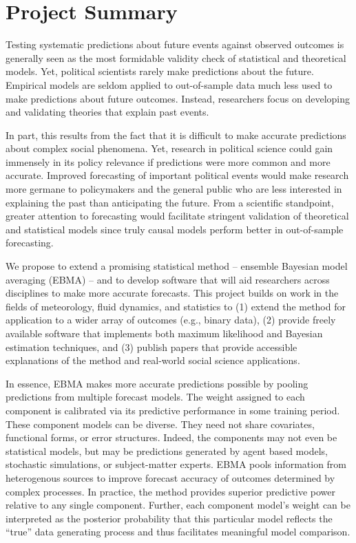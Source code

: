 \documentclass[pdftex,12pt,fullpage,oneside]{amsart}
\begin{document}
\section*{Project Summary}

\thispagestyle{empty}


Testing systematic predictions about future events against observed
outcomes is generally seen as the most formidable validity check of
statistical and theoretical models.  Yet, political scientists rarely
make predictions about the future.  Empirical models are seldom
applied to out-of-sample data much less used to make predictions about
future outcomes. Instead, researchers focus on developing and
validating theories that explain past events.

In part, this results from the fact that it is difficult to make
accurate predictions about complex social phenomena. Yet, research in
political science could gain immensely in its policy relevance if
predictions were more common and more accurate.  Improved forecasting
of important political events would make research more germane to
policymakers and the general public who are less interested in
explaining the past than anticipating the future.  From a scientific
standpoint, greater attention to forecasting would facilitate
stringent validation of theoretical and statistical models since truly
causal models perform better in out-of-sample forecasting.

We propose to extend a promising statistical method -- ensemble
Bayesian model averaging (EBMA) -- and to develop software that will
aid researchers across disciplines to make more accurate forecasts.
This project builds on work in the fields of meteorology, fluid
dynamics, and statistics to (1) extend the method for application to a
wider array of outcomes (e.g., binary data), (2) provide freely
available software that implements both maximum likelihood and
Bayesian estimation techniques, and (3) publish papers that provide
accessible explanations of the method and real-world social science
applications.

In essence, EBMA makes more accurate predictions possible by pooling
predictions from multiple forecast models. The weight assigned to each
component is calibrated via its predictive performance in some
training period. These component models can be diverse.  They need not
share covariates, functional forms, or error structures. Indeed, the
components may not even be statistical models, but may be predictions
generated by agent based models, stochastic simulations, or
subject-matter experts. EBMA pools information from heterogenous
sources to improve forecast accuracy of outcomes determined by complex
processes.  In practice, the method provides superior predictive power
relative to any single component. Further, each component model's
weight can be interpreted as the posterior probability that this
particular model reflects the ``true'' data generating process and
thus facilitates meaningful model comparison.
\end{document}
